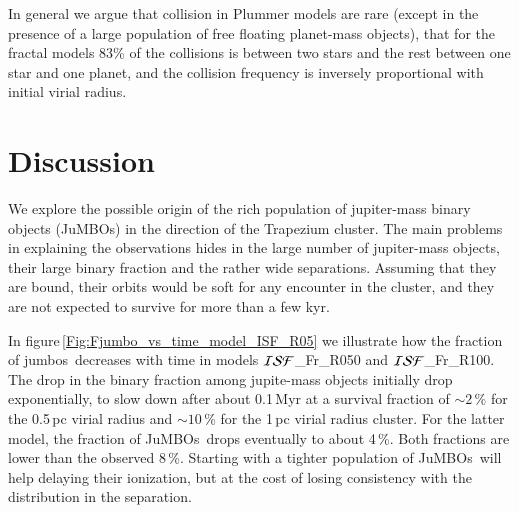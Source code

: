 \documentclass[submission,phys]{lib/SciPost}
\newcommand{\jumbos}{\mbox{JuMBOs}}
\begin{document}
In general we argue that collision in Plummer models are rare (except
in the presence of a large population of free floating planet-mass
objects), that for the fractal models 83\% of the collisions is
between two stars and the rest between one star and one planet, and
the collision frequency is inversely proportional with initial virial
radius.

\section{Discussion}

We explore the possible origin of the rich population of jupiter-mass
binary objects (\jumbos) in the direction of the Trapezium cluster.
The main problems in explaining the observations hides in the large
number of jupiter-mass objects, their large binary fraction and the
rather wide separations. Assuming that they are bound, their orbits
would be soft for any encounter in the cluster, and they are not
expected to survive for more than a few kyr.

In figure\,\ref{Fig:Fjumbo_vs_time_model_ISF_R05} we illustrate how
the fraction of jumbos\, decreases with time in models ${\cal
  ISF}$\_Fr\_R050 and ${\cal ISF}$\_Fr\_R100.  The drop in the binary
fraction among jupite-mass objects initially drop exponentially, to
slow down after about 0.1\,Myr at a survival fraction of $\sim 2$\,\%
for the 0.5\,pc virial radius and $\sim 10$\,\% for the 1\,pc virial
radius cluster. For the latter model, the fraction of \jumbos\, drops
eventually to about 4\,\%. Both fractions are lower than the observed
8\,\%. Starting with a tighter population of \jumbos\, will help
delaying their ionization, but at the cost of losing consistency with
the distribution in the separation.
\end{document}
